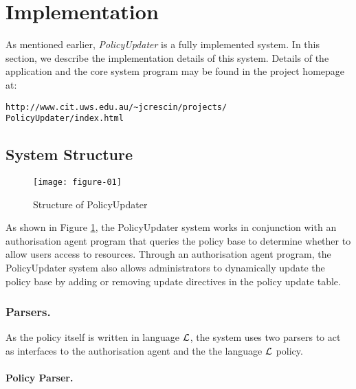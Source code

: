 \documentclass[global,twocolumn,final]{svjour}
\newenvironment{vquote}
  {\begin{list}{}{\leftmargin 1em}\item[]}
  {\end{list}}
\begin{document}
  \section{Implementation}
    \label{sec-implement}

    As mentioned earlier, {\em PolicyUpdater} is a fully implemented system.
    In this section, we describe the implementation details of this system.
    Details of the application and the core system program may be found in
    the project homepage at:

    \begin{vquote}
      {\tt\scriptsize http://www.cit.uws.edu.au/\~{}jcrescin/projects/} \\
      {\tt\scriptsize PolicyUpdater/index.html}
    \end{vquote}

    \subsection{System Structure}

    \begin{figure}[ht]
      \begin{center}
        \texttt{[image: figure-01]}
        \caption{Structure of PolicyUpdater}
        \label{fig-1}
      \end{center}
    \end{figure}

      As shown in Figure \ref{fig-1}, the PolicyUpdater system works in
      conjunction with an authorisation agent program that queries the
      policy base to determine whether to allow users access to resources.
      Through an authorisation agent program, the PolicyUpdater system also
      allows administrators to dynamically update the policy base by adding
      or removing update directives in the policy update table.

      \subsubsection{Parsers.}

        As the policy itself is written in language ${\cal L}$, the system uses
        two parsers to act as interfaces to the authorisation agent and
        the the language ${\cal L}$ policy.

        \paragraph{Policy Parser.}
\end{document}
